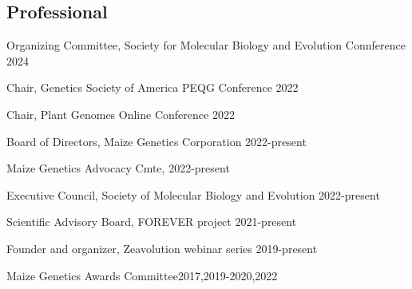 \documentclass[letterpaper,10pt]{article}
\renewenvironment{itemize}{
  \begin{list}{}{
    \setlength{\leftmargin}{1.5em}
  }
}{
  \end{list}
}
\begin{document}
\begin{itemize}
\subsection*{Professional}
\item Organizing Committee, Society for Molecular Biology and Evolution Connference \hfill 2024
\item Chair, Genetics Society of America PEQG Conference  \hfill2022
\item Chair, Plant Genomes Online Conference \hfill 2022
\item Board of Directors, Maize Genetics Corporation \hfill2022-present
\item Maize Genetics Advocacy Cmte, \hfill 2022-present
\item Executive Council, Society of Molecular Biology and Evolution \hfill2022-present
\item Scientific Advisory Board, FOREVER project \hfill2021-present %
\item Founder and organizer, Zeavolution webinar series \hfill2019-present
\item Maize Genetics Awards Committee\hfill2017,2019-2020,2022

\end{itemize}
\end{document}
